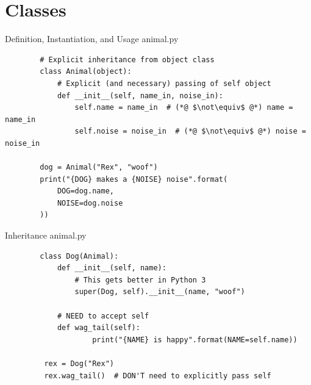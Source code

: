\documentclass[11pt]{beamer}
\begin{document}
\section{Classes}
\begin{frame}[fragile]{Definition, Instantiation, and Usage}
	animal.py
	\begin{lstlisting}
		# Explicit inheritance from object class
		class Animal(object):
		    # Explicit (and necessary) passing of self object
		    def __init__(self, name_in, noise_in):
		        self.name = name_in  # (*@ $\not\equiv$ @*) name = name_in
		        self.noise = noise_in  # (*@ $\not\equiv$ @*) noise = noise_in
		
		dog = Animal("Rex", "woof")
		print("{DOG} makes a {NOISE} noise".format(
		    DOG=dog.name,
		    NOISE=dog.noise
		))
	\end{lstlisting}
\end{frame}

\begin{frame}[fragile]{Inheritance}
	animal.py
	\begin{lstlisting}
		class Dog(Animal):
		    def __init__(self, name):
		        # This gets better in Python 3
		        super(Dog, self).__init__(name, "woof")
		    
		    # NEED to accept self
		    def wag_tail(self):
		    	    print("{NAME} is happy".format(NAME=self.name))
		 
		 rex = Dog("Rex")
		 rex.wag_tail()  # DON'T need to explicitly pass self
	\end{lstlisting}
\end{frame}
\end{document}
